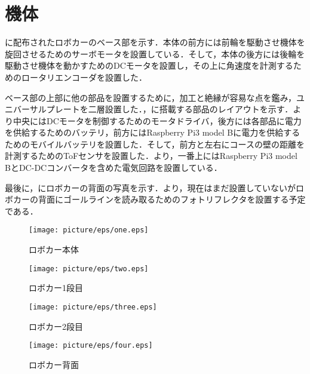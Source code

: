 \section{機体}
に配布されたロボカーのベース部を示す．本体の前方には前輪を駆動させ機体を旋回させるためのサーボモータを設置している．そして，本体の後方には後輪を駆動させ機体を動かすためのDCモータを設置し，その上に角速度を計測するためのロータリエンコーダを設置した．

ベース部の上部に他の部品を設置するために，加工と絶縁が容易な点を鑑み，ユニバーサルプレートを二層設置した．，に搭載する部品のレイアウトを示す．より中央にはDCモータを制御するためのモータドライバ，後方には各部品に電力を供給するためのバッテリ，前方にはRaspberry Pi3 model Bに電力を供給するためのモバイルバッテリを設置した．そして，前方と左右にコースの壁の距離を計測するためのToFセンサを設置した．より，一番上にはRaspberry Pi3 model BとDC-DCコンバータを含めた電気回路を設置している．

最後に，にロボカーの背面の写真を示す．より，現在はまだ設置していないがロボカーの背面にゴールラインを読み取るためのフォトリフレクタを設置する予定である．

\begin{figure}[htb]
\centering
\texttt{[image: picture/eps/one.eps]}
\caption{ロボカー本体}
\label{fig::first}
\end{figure}

\begin{figure}[htb]
\centering
\texttt{[image: picture/eps/two.eps]}
\caption{ロボカー1段目}
\label{fig::second}
\end{figure}

\begin{figure}[htb]
\centering
\texttt{[image: picture/eps/three.eps]}
\caption{ロボカー2段目}
\label{fig::third}
\end{figure}

\begin{figure}[htb]
\centering
\texttt{[image: picture/eps/four.eps]}
\caption{ロボカー背面}
\label{fig::forth}
\end{figure}